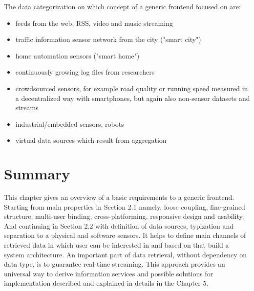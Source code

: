     The data categorization on which concept of a generic frontend focused on are:
    \begin{itemize}
    \item feeds from the web, RSS, video and music streaming
    \item traffic information sensor network from the city ("smart city")
    \item home automation sensors ("smart home")
    \item continuously growing log files from researchers
    \item crowdsourced sensors, for example road quality or running speed measured in a decentralized way with smartphones, but again also non-sensor datasets and streams
    \item industrial/embedded sensors, robots
    \item virtual data sources which result from aggregation
    \end{itemize}

\section{Summary}
	This chapter gives an overview of a basic requirements to a generic frontend. Starting from main properties in Section 2.1 namely, loose coupling, fine-grained structure, multi-user binding, cross-platforming, responsive design and usability. And continuing in Section 2.2 with definition of data sources, typization and separation to a physical and software sensors. It helps to define main channels of retrieved data in which user can be interested in and based on that build a system architecture. An important part of data retrieval, without dependency on data type, is to guarantee real-time streaming. This approach provides an universal way to derive information services and possible solutions for implementation described and explained in details in the Chapter 5.
